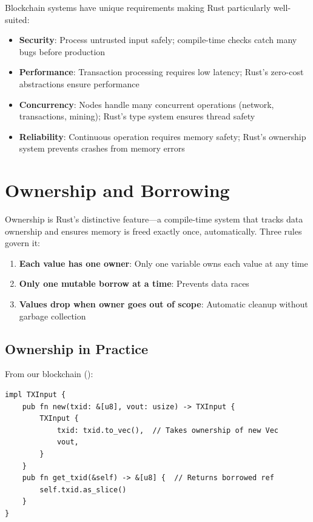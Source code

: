 Blockchain systems have unique requirements making Rust particularly well-suited:

\begin{itemize}
  \item \textbf{Security}: Process untrusted input safely; compile-time checks catch many bugs before production
  \item \textbf{Performance}: Transaction processing requires low latency; Rust's zero-cost abstractions ensure performance
  \item \textbf{Concurrency}: Nodes handle many concurrent operations (network, transactions, mining); Rust's type system ensures thread safety
  \item \textbf{Reliability}: Continuous operation requires memory safety; Rust's ownership system prevents crashes from memory errors
\end{itemize}

\section{Ownership and Borrowing}
\label{sec:ch24-ownership}

Ownership is Rust's distinctive feature---a compile-time system that tracks data ownership and ensures memory is freed exactly once, automatically. Three rules govern it:

\begin{enumerate}
  \item \textbf{Each value has one owner}: Only one variable owns each value at any time
  \item \textbf{Only one mutable borrow at a time}: Prevents data races
  \item \textbf{Values drop when owner goes out of scope}: Automatic cleanup without garbage collection
\end{enumerate}

\subsection{Ownership in Practice}
\label{subsec:ch24-ownership-practice}

From our blockchain ():

\begin{listing}[htbp]
\caption{Ownership example in TXInput implementation}
\label{lst:ch24-ownership-1}
\begin{verbatim}
impl TXInput {
    pub fn new(txid: &[u8], vout: usize) -> TXInput {
        TXInput {
            txid: txid.to_vec(),  // Takes ownership of new Vec
            vout,
        }
    }
    pub fn get_txid(&self) -> &[u8] {  // Returns borrowed ref
        self.txid.as_slice()
    }
}
\end{verbatim}
\end{listing}

